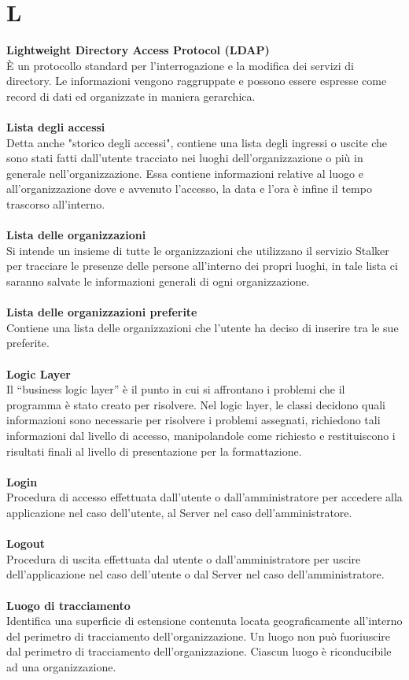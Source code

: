 \section{L}
\textbf{Lightweight Directory Access Protocol (LDAP)}\\
È un protocollo standard per l'interrogazione e la modifica dei servizi di directory. Le informazioni vengono raggruppate e possono essere espresse come record di dati ed organizzate in maniera gerarchica. \\ \\
\textbf{Lista degli accessi}\\
Detta anche "storico degli accessi", contiene una lista degli ingressi o uscite che sono stati fatti dall'utente tracciato nei luoghi dell'organizzazione o più in generale nell'organizzazione. Essa contiene informazioni relative al luogo e all'organizzazione dove e avvenuto l'accesso, la data e l'ora è infine il tempo trascorso all'interno.\\ \\
\textbf{Lista delle organizzazioni}\\
Si intende un insieme di tutte le organizzazioni che utilizzano il servizio Stalker per tracciare le presenze delle persone all’interno dei propri luoghi, in tale lista ci saranno salvate le informazioni generali di ogni organizzazione.\\ \\
\textbf{Lista delle organizzazioni preferite}\\
Contiene una lista delle organizzazioni che l'utente ha deciso di inserire tra le sue preferite. \\ \\
\textbf{Logic Layer}\\
Il “business logic layer” è il punto in cui si affrontano i problemi che il programma è stato creato per risolvere. Nel logic layer, le classi decidono quali informazioni sono necessarie per risolvere i problemi assegnati, richiedono tali informazioni dal livello di accesso, manipolandole come richiesto e restituiscono i risultati finali al livello di presentazione per la formattazione. \\ \\
\textbf{Login} \\
Procedura di accesso effettuata dall'utente o dall'amministratore per accedere alla applicazione nel caso dell'utente, al Server nel caso dell'amministratore.\\ \\
\textbf{Logout} \\
Procedura di uscita effettuata dal utente o dall'amministratore per uscire dell'applicazione nel caso dell'utente o dal Server nel caso dell'amministratore. \\ \\
\textbf{Luogo di tracciamento}\\
Identifica una superficie di estensione contenuta locata geograficamente all'interno del perimetro di tracciamento dell'organizzazione. Un luogo non può fuoriuscire dal perimetro di tracciamento dell'organizzazione. Ciascun luogo è riconducibile ad una organizzazione.\\ \\

\clearpage